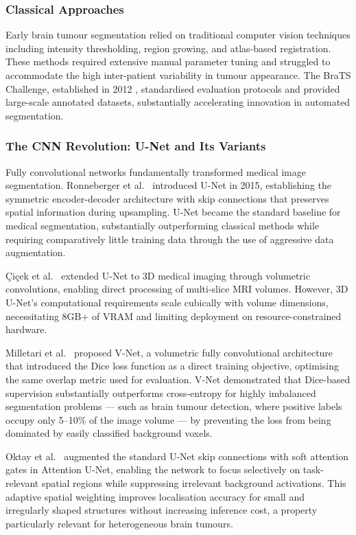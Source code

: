 \documentclass{article}
\begin{document}
\subsubsection{Classical Approaches}

Early brain tumour segmentation relied on traditional computer vision techniques including intensity thresholding, region growing, and atlas-based registration. These methods required extensive manual parameter tuning and struggled to accommodate the high inter-patient variability in tumour appearance. The BraTS Challenge, established in 2012 \cite{menze2015multimodal, bakas2017advancing}, standardised evaluation protocols and provided large-scale annotated datasets, substantially accelerating innovation in automated segmentation.

\subsubsection{The CNN Revolution: U-Net and Its Variants}

Fully convolutional networks fundamentally transformed medical image segmentation. Ronneberger et al.\ \cite{ronneberger2015unet} introduced U-Net in 2015, establishing the symmetric encoder-decoder architecture with skip connections that preserves spatial information during upsampling. U-Net became the standard baseline for medical segmentation, substantially outperforming classical methods while requiring comparatively little training data through the use of aggressive data augmentation.

\c{C}i\c{c}ek et al.\ \cite{cicek20163d} extended U-Net to 3D medical imaging through volumetric convolutions, enabling direct processing of multi-slice MRI volumes. However, 3D U-Net's computational requirements scale cubically with volume dimensions, necessitating 8GB+ of VRAM and limiting deployment on resource-constrained hardware.

Milletari et al.\ \cite{milletari2016vnet} proposed V-Net, a volumetric fully convolutional architecture that introduced the Dice loss function as a direct training objective, optimising the same overlap metric used for evaluation. V-Net demonstrated that Dice-based supervision substantially outperforms cross-entropy for highly imbalanced segmentation problems — such as brain tumour detection, where positive labels occupy only 5--10\% of the image volume — by preventing the loss from being dominated by easily classified background voxels.

Oktay et al.\ \cite{oktay2018attention} augmented the standard U-Net skip connections with soft attention gates in Attention U-Net, enabling the network to focus selectively on task-relevant spatial regions while suppressing irrelevant background activations. This adaptive spatial weighting improves localisation accuracy for small and irregularly shaped structures without increasing inference cost, a property particularly relevant for heterogeneous brain tumours.
\end{document}
